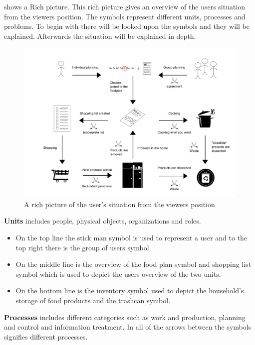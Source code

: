  shows a Rich picture. This rich picture gives an overview of the users situation from the viewers position.
The symbols represent different units, processes and problems.
To begin with there will be looked upon the symbols and they will be explained. Afterwards the situation will be explained in depth.

  \begin{figure}[H]
	\centering
	\includegraphics[width=1.00\textwidth]{Grafik/FoodPlanner/InkscapeTegninger/RigtBilledeUpdated.pdf}
	\caption{A rich picture of the user's situation from the viewers position}
	\label{RigtBillede}
\end{figure}
\textbf{Units} includes people, physical objects, organizations and roles.
\begin{itemize}
  \item On the top line the stick man symbol is used to represent a user and to the top right there is the group of users symbol. 
  \item On the middle line is the overview of the food plan symbol and shopping list symbol which is used to depict the users overview of the two units. 
  \item On the bottom line is the inventory symbol used to depict the household's storage of food products and the trashcan symbol.    
\end{itemize}
\textbf{Processes} includes different categories such as work and production, planning and control and information treatment. In  all of the arrows between the symbols signifies different processes.
